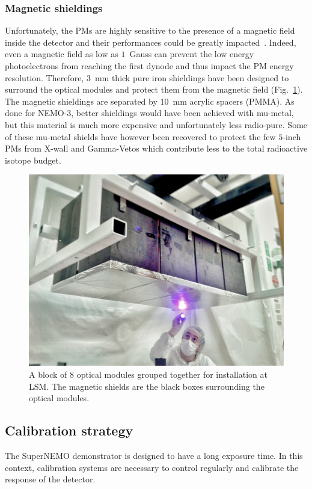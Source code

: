 \subsubsection*{Magnetic shieldings}

Unfortunately, the PMs are highly sensitive to the presence of a magnetic field inside the detector and their performances could be greatly impacted~\cite{CalvezThesis,internal:magnetic_field}.
Indeed, even a magnetic field as low as $1$~Gauss can prevent the low energy photoelectrons from reaching the first dynode and thus impact the PM energy resolution.
Therefore, $3$~mm thick pure iron shieldings have been designed to surround the optical modules and protect them from the magnetic field (Fig.~\ref{fig:magnetic_shields}).
The magnetic shieldings are separated by $10$~mm acrylic spacers (PMMA).
As done for NEMO-$3$, better shieldings would have been achieved with mu-metal, but this material is much more expensive and unfortunately less radio-pure.
Some of these mu-metal shields have however been recovered to protect the few $5$-inch PMs from X-wall and Gamma-Vetos which contribute less to the total radioactive isotope budget.
\begin{figure}[h!]
\centering
\includegraphics[height=0.5\textwidth]{SNdemonstrator/fig_SNdemonstrator/magnetic_shields.jpg}
\caption{A block of $8$ optical modules grouped together for installation at LSM.
  The magnetic shields are the black boxes surrounding the optical modules.
\label{fig:magnetic_shields}}
\end{figure}


\subsection{Calibration strategy}
\label{subsec:calib}

The SuperNEMO demonstrator is designed to have a long exposure time.
In this context, calibration systems are necessary to control regularly and calibrate the response of the detector.


